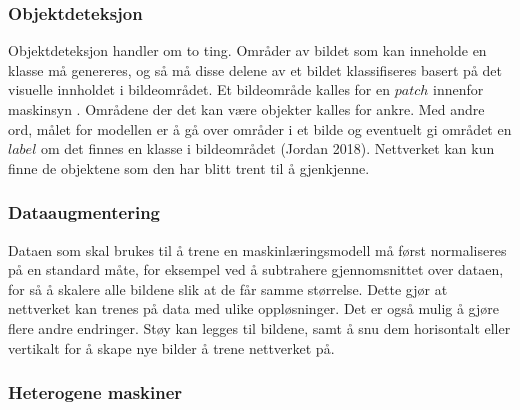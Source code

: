 \subsubsection{Objektdeteksjon}

Objektdeteksjon handler om to ting. Områder av bildet som kan inneholde en klasse må genereres, og så må disse delene av et bildet klassifiseres basert på det visuelle innholdet i bildeområdet. Et bildeområde kalles for en $patch$ innenfor maskinsyn \cite{LeCun m.fl. 1998 s. 23}. Områdene der det kan være objekter kalles for ankre. Med andre ord, målet for modellen er å gå over områder i et bilde og eventuelt gi området en $label$ om det finnes en klasse i bildeområdet (Jordan 2018). Nettverket kan kun finne de objektene som den har blitt trent til å gjenkjenne.

\subsubsection{Dataaugmentering}

Dataen som skal brukes til å trene en maskinlæringsmodell må først normaliseres på en standard måte, for eksempel ved å subtrahere gjennomsnittet over dataen, for så å skalere alle bildene slik at de får samme størrelse. Dette gjør at nettverket kan trenes på data med ulike oppløsninger. Det er også mulig å gjøre flere andre endringer. Støy kan legges til bildene, samt å snu dem horisontalt eller vertikalt for å skape nye bilder å trene nettverket på. \cite{Cadieu m.fl. 2014 s. 15}

\subsubsection{Heterogene maskiner}



